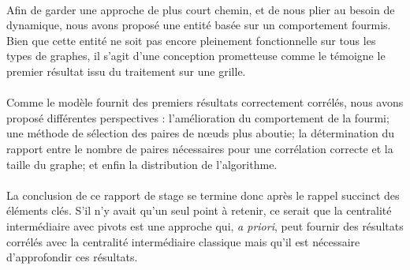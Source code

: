 \documentclass[a4paper, 10pt]{report}
\begin{document}
\paragraph{}Afin de garder une approche de plus court chemin, et de nous plier au besoin de dynamique, nous avons proposé une entité basée sur un comportement fourmis. Bien que cette entité ne soit pas encore pleinement fonctionnelle sur tous les types de graphes, il s'agit d'une conception prometteuse comme le témoigne le premier résultat issu du traitement sur une grille.

\paragraph{}Comme le modèle fournit des premiers résultats correctement corrélés, nous avons proposé différentes perspectives : l'amélioration du comportement de la fourmi; une méthode de sélection des paires de n\oe uds plus aboutie; la détermination du rapport entre le nombre de paires nécessaires pour une corrélation correcte et la taille du graphe; et enfin la distribution de l'algorithme.

\paragraph{}La conclusion de ce rapport de stage se termine donc après le rappel succinct des éléments clés. S'il n'y avait qu'un seul point à retenir, ce serait que la centralité intermédiaire avec pivots est une approche qui, \textit{a priori}, peut fournir des résultats corrélés avec la centralité intermédiaire classique mais qu'il est nécessaire d'approfondir ces résultats.




\printindex
\end{document}

